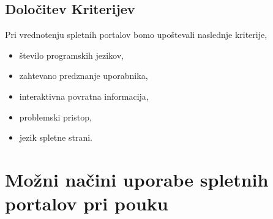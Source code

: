 \subsection{Določitev Kriterijev}
\label{sec:dolocitev_kriterijev}

Pri vrednotenju spletnih portalov bomo upoštevali naslednje
kriterije,


\begin{itemize}
\tightlist
\item število programskih jezikov,
\item zahtevano predznanje uporabnika,
\item interaktivna povratna informacija,
\item problemski pristop,
\item jezik spletne strani.
\end{itemize}

\section{Možni načini uporabe spletnih portalov pri pouku}
\label{sec:načini_uporabe_sp}

